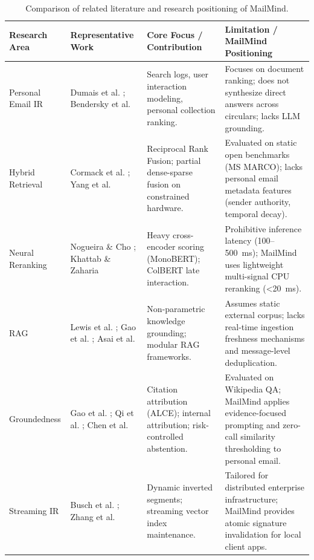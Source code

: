 \documentclass[11pt,a4paper]{article}
\begin{document}
\begin{table}[t]
\centering
\small
\caption{Comparison of related literature and research positioning of MailMind.}
\label{tab:related_work}
\begin{tabularx}{\textwidth}{l p{3.2cm} p{4.0cm} p{4.5cm}}
\toprule
\textbf{Research Area} & \textbf{Representative Work} & \textbf{Core Focus / Contribution} & \textbf{Limitation / MailMind Positioning} \\
\midrule
Personal Email IR & Dumais et al. \cite{dumais2003stuff}; Bendersky et al. \cite{bendersky2017learning, bendersky2020search} & Search logs, user interaction modeling, personal collection ranking. & Focuses on document ranking; does not synthesize direct answers across circulars; lacks LLM grounding. \\
Hybrid Retrieval & Cormack et al. \cite{cormack2009reciprocal}; Yang et al. \cite{yang2024cluster} & Reciprocal Rank Fusion; partial dense-sparse fusion on constrained hardware. & Evaluated on static open benchmarks (MS MARCO); lacks personal email metadata features (sender authority, temporal decay). \\
Neural Reranking & Nogueira \& Cho \cite{nogueira2019passage}; Khattab \& Zaharia \cite{khattab2020colbert} & Heavy cross-encoder scoring (MonoBERT); ColBERT late interaction. & Prohibitive inference latency (100--500~ms); MailMind uses lightweight multi-signal CPU reranking (<20~ms). \\
RAG & Lewis et al. \cite{lewis2020retrieval}; Gao et al. \cite{gao2023rag_survey}; Asai et al. \cite{asai2024self_rag} & Non-parametric knowledge grounding; modular RAG frameworks. & Assumes static external corpus; lacks real-time ingestion freshness mechanisms and message-level deduplication. \\
Groundedness & Gao et al. \cite{gao2023enabling}; Qi et al. \cite{qi2024model}; Chen et al. \cite{chen2024controlling} & Citation attribution (ALCE); internal attribution; risk-controlled abstention. & Evaluated on Wikipedia QA; MailMind applies evidence-focused prompting and zero-call similarity thresholding to personal email. \\
Streaming IR & Busch et al. \cite{busch2012earlybird}; Zhang et al. \cite{zhang2023incremental} & Dynamic inverted segments; streaming vector index maintenance. & Tailored for distributed enterprise infrastructure; MailMind provides atomic signature invalidation for local client apps. \\
\bottomrule
\end{tabularx}
\end{table}
\end{document}
